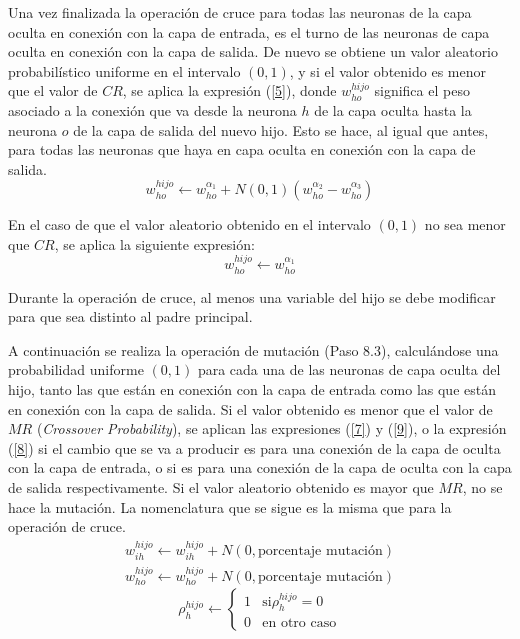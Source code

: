 Una vez finalizada la operación de cruce para todas las neuronas de la capa oculta en
conexión
con la capa de entrada, es el turno de las neuronas de capa oculta en conexión con la capa de
salida. De nuevo se obtiene un valor aleatorio probabilístico uniforme en el intervalo $(0,1)$, y si
el valor obtenido es menor que el valor de $CR$, se aplica la expresión (\ref{5}), donde
$w_{ho}^{hijo}$ significa el peso asociado a la conexión que
va desde la neurona $h$ de la capa oculta hasta la neurona $o$ de la capa de salida  del nuevo hijo.
Esto se hace, al igual que antes, para todas las neuronas que haya en capa oculta en conexión con la
capa de salida.
\begin{equation}\label{5}
w_{ho}^{hijo} \leftarrow w_{ho}^{\alpha_{1}} +
N(0,1)(w_{ho}^{\alpha_{2}}-w_{ho}^{\alpha_{3}})
\end{equation}

En el caso de que el valor aleatorio obtenido en el intervalo $(0,1)$ no sea menor que $CR$, se
aplica la siguiente expresión:
\begin{equation}\label{6}
w_{ho}^{hijo} \leftarrow w_{ho}^{\alpha_{1}}
\end{equation}

Durante la operación de cruce, al menos una variable del hijo se debe modificar para que
sea distinto al padre principal.

A continuación se realiza la operación de mutación (Paso 8.3), calculándose
una probabilidad uniforme $(0,1)$ para cada una de las neuronas de capa oculta del hijo, tanto
las que están en conexión con la capa de entrada como las que están en conexión con la capa de
salida. Si el valor obtenido es menor que el valor de $MR$ (\textit{Crossover Probability}), se
aplican las expresiones (\ref{7}) y (\ref{9}), o la expresión (\ref{8}) si el cambio que se va a
producir es para una conexión de la  capa de oculta con la capa de entrada, o si
es para una conexión de la  capa de oculta con la capa de salida respectivamente. Si el valor
aleatorio obtenido es mayor que $MR$, no se hace la mutación. La nomenclatura que se sigue es la
misma que para la operación de cruce.
\begin{eqnarray}
w_{ih}^{hijo} \leftarrow w_{ih}^{hijo} +
N(0,\text{porcentaje mutación}) \label{7} \\
w_{ho}^{hijo} \leftarrow w_{ho}^{hijo} +
N(0,\text{porcentaje mutación}) \label{8}
\end{eqnarray}
\begin{equation}\label{9}
\rho_{h}^{hijo} \leftarrow \left\lbrace
\begin{array}{ll}
1 & \mbox{si
$\rho_{h}^{hijo}=0$} \\
0 & \mbox{en otro caso}
\end{array}
\right.
\end{equation}

